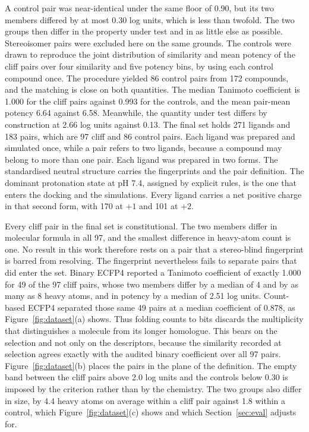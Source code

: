A control pair was near-identical under the same floor of 0.90, but its two members
differed by at most 0.30 log units, which is less than twofold. The two groups then
differ in the property under test and in as little else as possible. Stereoisomer pairs
were excluded here on the same grounds. The controls were drawn to reproduce the joint
distribution of similarity and mean potency of the cliff pairs over four similarity and
five potency bins, by using each control compound once. The procedure yielded 86
control pairs from 172 compounds, and the matching is close on both quantities. The
median Tanimoto coefficient is 1.000 for the cliff pairs against 0.993 for the
controls, and the mean pair-mean potency 6.64 against 6.58. Meanwhile, the quantity
under test differs by construction at 2.66 log units against 0.13. The final set holds
271 ligands and 183 pairs, which are 97 cliff and 86 control pairs. Each ligand was
prepared and simulated once, while a pair refers to two ligands, because a compound may
belong to more than one pair. Each ligand was prepared in two forms. The standardised
neutral structure carries the fingerprints and the pair definition. The dominant
protonation state at pH 7.4, assigned by explicit rules, is the one that enters the
docking and the simulations. Every ligand carries a net positive charge in that second
form, with 170 at $+1$ and 101 at $+2$.

Every cliff pair in the final set is constitutional. The two members differ in
molecular formula in all 97, and the smallest difference in heavy-atom count is one. No
result in this work therefore rests on a pair that a stereo-blind fingerprint is barred
from resolving. The fingerprint nevertheless fails to separate pairs that did enter the
set. Binary ECFP4 reported a Tanimoto coefficient of exactly 1.000 for 49 of the 97
cliff pairs, whose two members differ by a median of 4 and by as many as 8 heavy atoms,
and in potency by a median of 2.51 log units. Count-based ECFP4 separated those same 49
pairs at a median coefficient of 0.878, as Figure~\ref{fig:dataset}(a) shows. Thus
folding counts to bits discards the multiplicity that distinguishes a molecule from its
longer homologue. This bears on the selection and not only on the descriptors, because
the similarity recorded at selection agrees exactly with the audited binary coefficient
over all 97 pairs. Figure~\ref{fig:dataset}(b) places the pairs in the plane of the
definition. The empty band between the cliff pairs above 2.0 log units and the controls
below 0.30 is imposed by the criterion rather than by the chemistry. The two groups
also differ in size, by 4.4 heavy atoms on average within a cliff pair against 1.8
within a control, which Figure~\ref{fig:dataset}(c) shows and which
Section~\ref{sec:eval} adjusts for.

